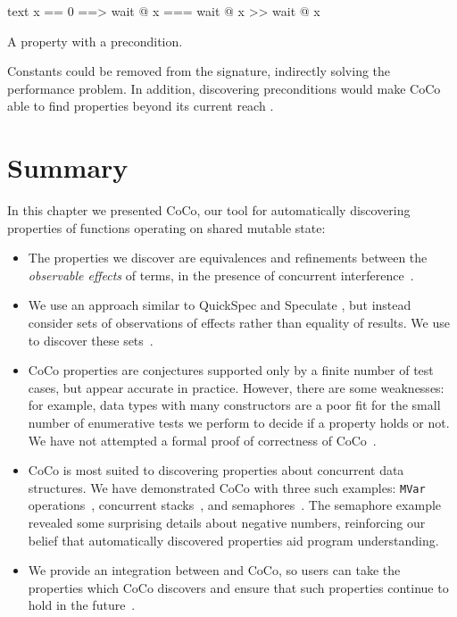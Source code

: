 \begin{listing}
\centering
\begin{cminted}{text}
x == 0  ==>  wait @ x  ===  wait @ x >> wait @ x
\end{cminted}
\caption{A property with a precondition.}\label{lst:precondition}
\end{listing}

Constants could be removed from the signature, indirectly solving the
performance problem.  In addition, discovering preconditions would
make CoCo able to find properties beyond its current
reach \parencite{braquehais2017}.

\section{Summary}

In this chapter we presented CoCo, our tool for automatically
discovering properties of functions operating on shared mutable state:

\begin{itemize}
\item The properties we discover are equivalences and refinements
  between the \emph{observable effects} of terms, in the presence of
  concurrent interference~.

\item We use an approach similar to QuickSpec \parencite{smallbone2017} and
  Speculate \parencite{braquehais2017}, but instead consider sets of
  observations of effects rather than equality of results.  We use
  \dejafu{} to discover these sets~.

\item CoCo properties are conjectures supported only by a finite
  number of test cases, but appear accurate in practice.  However,
  there are some weaknesses: for example, data types with many
  constructors are a poor fit for the small number of enumerative
  tests we perform to decide if a property holds or not.  We have not
  attempted a formal proof of correctness of
  CoCo~.

\item CoCo is most suited to discovering properties about concurrent
  data structures.  We have demonstrated CoCo with three such
  examples: \verb|MVar| operations~, concurrent
  stacks~, and
  semaphores~.  The semaphore example
  revealed some surprising details about negative numbers, reinforcing
  our belief that automatically discovered properties aid program
  understanding.

\item We provide an integration between \dejafu{} and CoCo, so users
  can take the properties which CoCo discovers and ensure that such
  properties continue to hold in the future~.
\end{itemize}

